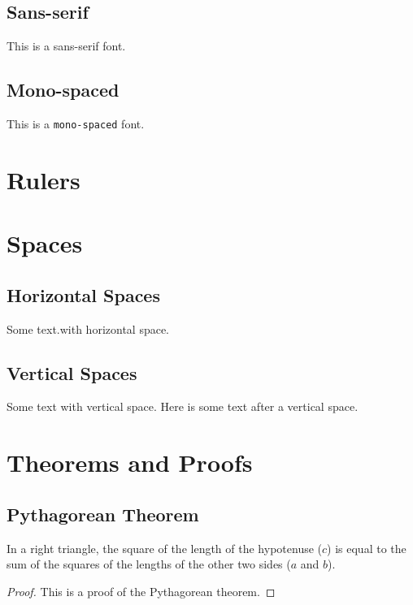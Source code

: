 \documentclass{article}
\begin{document}
\subsection{Sans-serif}
This is a \textsf{sans-serif} font.
\subsection{Mono-spaced}
This is a \texttt{mono-spaced} font.

\section{Rulers}
\hrulefill

\section{Spaces}
\subsection{Horizontal Spaces}
Some text.\hspace{2cm}with horizontal space.
\subsection{Vertical Spaces}
Some text with vertical space.
\vspace{1cm}
Here is some text after a vertical space.

\section{Theorems and Proofs}
\subsection{Pythagorean Theorem}
\begin{theorem}
In a right triangle, the square of the length of the hypotenuse ($c$) is equal to the sum of the squares of the lengths of the other two sides ($a$ and $b$).
\end{theorem}
\begin{proof}
This is a proof of the Pythagorean theorem.
\end{proof}



\end{document}
